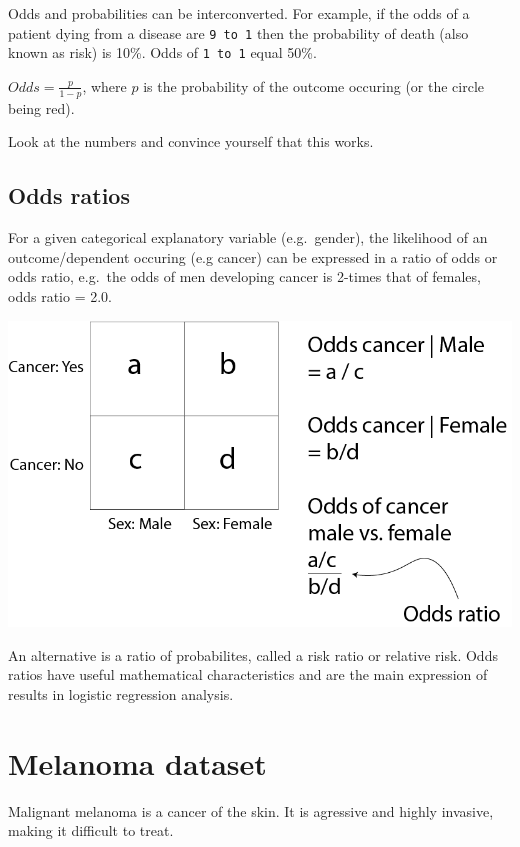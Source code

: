 \documentclass[12pt,]{krantz}
\theoremstyle{definition}
\theoremstyle{definition}
\theoremstyle{definition}
\theoremstyle{remark}
\begin{document}
Odds and probabilities can be interconverted. For example, if the odds
of a patient dying from a disease are \texttt{9\ to\ 1} then the
probability of death (also known as risk) is 10\%. Odds of
\texttt{1\ to\ 1} equal 50\%.

\(Odds = \frac{p}{1-p}\), where \(p\) is the probability of the outcome
occuring (or the circle being red).

Look at the numbers and convince yourself that this works.

\hypertarget{odds-ratios}{%
\subsection{Odds ratios}\label{odds-ratios}}

For a given categorical explanatory variable (e.g.~gender), the
likelihood of an outcome/dependent occuring (e.g cancer) can be
expressed in a ratio of odds or odds ratio, e.g.~the odds of men
developing cancer is 2-times that of females, odds ratio = 2.0.

\includegraphics{images/or.png}

An alternative is a ratio of probabilites, called a risk ratio or
relative risk. Odds ratios have useful mathematical characteristics and
are the main expression of results in logistic regression analysis.

\newpage

\hypertarget{melanoma-dataset}{%
\section{Melanoma dataset}\label{melanoma-dataset}}

Malignant melanoma is a cancer of the skin. It is agressive and highly
invasive, making it difficult to treat.
\end{document}
